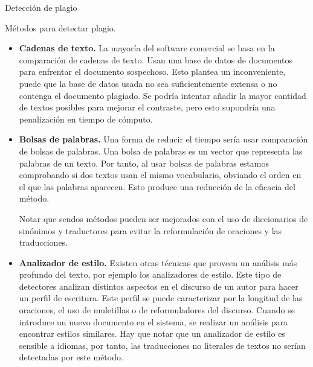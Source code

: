 \begin{section}{Detecci\'on de plagio}
\begin{subsection}{M\'etodos para detectar plagio.}
\begin{itemize}
				
				\item \textbf{Cadenas de texto.} La mayor\'ia del software comercial se basa en la comparaci\'on de cadenas de texto. Usan una base de datos de documentos para enfrentar el documento sospechoso. Esto plantea un inconveniente, puede que la base de datos usada no sea suficientemente extensa o no contenga el documento plagiado. Se podr\'ia intentar a\~nadir la mayor cantidad de textos posibles para mejorar el contraste, pero esto supondr\'ia una penalizaci\'on en tiempo de c\'omputo.\\
				
				\item \textbf{Bolsas de palabras.} Una forma de reducir el tiempo ser\'ia usar comparaci\'on de bolsas de palabras. Una bolsa de palabras es un vector que representa las palabras de un texto. Por tanto, al usar bolsas de palabras estamos comprobando si dos textos usan el mismo vocabulario, obviando el orden en el que las palabras aparecen. Esto produce una reducci\'on de la eficacia del m\'etodo.
				
				Notar que sendos m\'etodos pueden ser mejorados con el uso de diccionarios de sin\'onimos y traductores para evitar la reformulaci\'on de oraciones y las traducciones.\\
				
				\item \textbf{Analizador de estilo.} Existen otras t\'ecnicas que proveen un an\'alisis m\'as profundo del texto, por ejemplo los analizadores de estilo. Este tipo de detectores analizan distintos aspectos en el discurso de un autor para hacer un perfil de escritura. Este perfil se puede caracterizar por la longitud de las oraciones, el uso de muletillas o de reformuladores del discurso. Cuando se introduce un nuevo documento en el sistema, se realizar un an\'alisis para encontrar estilos similares. Hay que notar que un analizador de estilo es sensible a idiomas, por tanto, las traducciones no literales de textos no ser\'ian detectadas por este m\'etodo.
				
			\end{itemize}
		\end{subsection}
		
		
		

\end{section}
